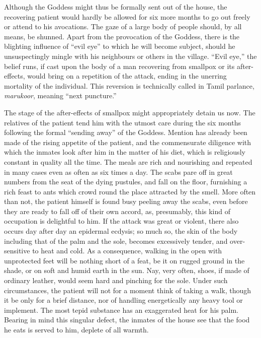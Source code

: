 \documentclass[a4paper, 12pt, oneside, english]{article}
\begin{document}
Although the Goddess might thus be formally sent out of the house, the recovering patient would hardly be allowed for six more months to go out freely or attend to his avocations. The gaze of a large body of people should, by all means, be shunned. Apart from the provocation of the Goddess, there is the blighting influence of ``evil eye'' to which he will become subject, should he unsuspectingly mingle with his neighbours or others in the village. ``Evil eye,'' the belief runs, if cast upon the body of a man recovering from smallpox or its after-effects, would bring on a repetition of the attack, ending in the unerring mortality of the individual. This reversion is technically called in Tamil parlance, \emph{marukoor}, meaning ``next puncture.''

The stage of the after-effects of smallpox might appropriately detain us now. The relatives of the patient tend him with the utmost care during the six months following the formal ``sending away'' of the Goddess. Mention has already been made of the rising appetite of the patient, and the commensurate diligence with which the inmates look after him in the matter of his diet, which is religiously constant in quality all the time. The meals are rich and nourishing and repeated in many cases even as often as six times a day. The scabs pare off in great numbers from the seat of the dying pustules, and fall on the floor, furnishing a rich feast to ants which crowd round the place attracted by the smell. More often than not, the patient himself is found busy peeling away the scabs, even before they are ready to fall off of their own accord, as, presumably, this kind of occupation is delightful to him. If the attack was great or violent, there also occurs day after day an epidermal ecdysis; so much so, the skin of the body including that of the palm and the sole, becomes excessively tender, and over-sensitive to heat and cold. As a consequence, walking in the open with unprotected feet will be nothing short of a feat, be it on rugged ground in the shade, or on soft and humid earth in the sun. Nay, very often, shoes, if made of ordinary leather, would seem hard and pinching for the sole. Under such circumstances, the patient will not for a moment think of taking a walk, though it be only for a brief distance, nor of handling energetically any heavy tool or implement. The most tepid substance has an exaggerated heat for his palm. Bearing in mind this singular defect, the inmates of the house see that the food he eats is served to him, deplete of all warmth.
\end{document}
